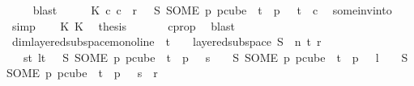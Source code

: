 \begin{isabellebody}
\ {\isacharasterisk}{\kern0pt}\ {\isacharasterisk}{\kern0pt}{\isacharasterisk}{\kern0pt}\ \isamarkupfalse%
\ blast\isanewline
\ \ \isamarkupfalse%
\ \isamarkupfalse%
\ K{}{\isacharcolon}{\kern0pt}\ {\isachardoublequoteopen}{\isasymexists}c{}{\isachardot}{\kern0pt}\ c{}\ {\isacharless}{\kern0pt}\ r\ {\isasymand}\ {\isasymchi}\ {\isacharparenleft}{\kern0pt}S\ {\isacharparenleft}{\kern0pt}SOME\ p{\isachardot}{\kern0pt}\ p{\isasymin}cube\ {}\ {\isacharparenleft}{\kern0pt}t{\isacharplus}{\kern0pt}{}{\isacharparenright}{\kern0pt}\ {\isasymand}\ p\ {}\ {\isacharequal}{\kern0pt}\ t{\isacharparenright}{\kern0pt}{\isacharparenright}{\kern0pt}\ {\isacharequal}{\kern0pt}\ c{}{\isachardoublequoteclose}\ \isamarkupfalse%
\ some{\isacharunderscore}{\kern0pt}inv{\isacharunderscore}{\kern0pt}into\ \isamarkupfalse%
\ simp\isanewline
\isanewline
\ \ \isamarkupfalse%
\ K{}\ K{}\ \isamarkupfalse%
\ {\isacharquery}{\kern0pt}thesis\ \isanewline
\ \ \ \ \isamarkupfalse%
\ c{}{\isacharunderscore}{\kern0pt}prop\ \isamarkupfalse%
\ blast\isanewline
{}\isamarkupfalse%
%
\endisatagproof
{\isafoldproof}%
%
\isadelimproof
\isanewline
%
\endisadelimproof
\isanewline
{}\isamarkupfalse%
\ dim{}{\isacharunderscore}{\kern0pt}layered{\isacharunderscore}{\kern0pt}subspace{\isacharunderscore}{\kern0pt}mono{\isacharunderscore}{\kern0pt}line{\isacharcolon}{\kern0pt}\ \ {\isachardoublequoteopen}t\ {\isachargreater}{\kern0pt}\ {}{\isachardoublequoteclose}\ \ {\isachardoublequoteopen}layered{\isacharunderscore}{\kern0pt}subspace\ S\ {}\ n\ t\ r\ {\isasymchi}{\isachardoublequoteclose}\isanewline
\ \ \ {\isachardoublequoteopen}{\isasymforall}s{\isacharless}{\kern0pt}t{\isachardot}{\kern0pt}\ {\isasymforall}l{\isacharless}{\kern0pt}t{\isachardot}{\kern0pt}\ \ {\isasymchi}\ {\isacharparenleft}{\kern0pt}S\ {\isacharparenleft}{\kern0pt}SOME\ p{\isachardot}{\kern0pt}\ p{\isasymin}cube\ {}\ {\isacharparenleft}{\kern0pt}t{\isacharplus}{\kern0pt}{}{\isacharparenright}{\kern0pt}\ {\isasymand}\ p\ {}\ {\isacharequal}{\kern0pt}\ s{\isacharparenright}{\kern0pt}{\isacharparenright}{\kern0pt}\ {\isacharequal}{\kern0pt}\ \ {\isasymchi}\ {\isacharparenleft}{\kern0pt}S\ {\isacharparenleft}{\kern0pt}SOME\ p{\isachardot}{\kern0pt}\ p{\isasymin}cube\ {}\ {\isacharparenleft}{\kern0pt}t{\isacharplus}{\kern0pt}{}{\isacharparenright}{\kern0pt}\ {\isasymand}\ p\ {}\ {\isacharequal}{\kern0pt}\ l{\isacharparenright}{\kern0pt}{\isacharparenright}{\kern0pt}\ {\isasymand}\ \ {\isasymchi}\ {\isacharparenleft}{\kern0pt}S\ {\isacharparenleft}{\kern0pt}SOME\ p{\isachardot}{\kern0pt}\ p{\isasymin}cube\ {}\ {\isacharparenleft}{\kern0pt}t{\isacharplus}{\kern0pt}{}{\isacharparenright}{\kern0pt}\ {\isasymand}\ p\ {}\ {\isacharequal}{\kern0pt}\ s{\isacharparenright}{\kern0pt}{\isacharparenright}{\kern0pt}\ {\isacharless}{\kern0pt}\ r{\isachardoublequoteclose}\isanewline

\end{isabellebody}
